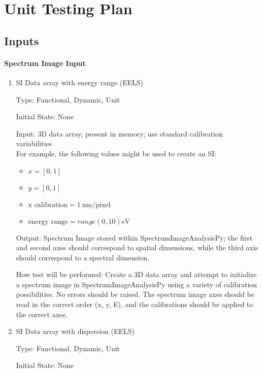 \documentclass[12pt, titlepage]{article}
\newcommand{\progname}{SpectrumImageAnalysisPy}
\begin{document}
				
\section{Unit Testing Plan}

\subsection{Inputs}
		
\paragraph{Spectrum Image Input}

\begin{enumerate}

\item{SI Data array with energy range (EELS)}

Type: Functional, Dynamic, Unit

Initial State: None

Input: 3D data array, present in memory; use standard calibration variabilities\\
For example, the following values might be used to create an SI: 
\begin{itemize}
	\item $x = [0, 1]$
	\item $y = [0, 1]$
	\item $\text{x calibration} = 1\ \si{\nano\metre}/\text{pixel}$
	\item $\text{energy range} = range(0, 10) \si{\electronvolt}$
\end{itemize}

Output: Spectrum Image stored within \progname{}; the first and second axes should correspond to spatial dimensions, while the third axis should correspond to a spectral dimension.

How test will be performed: Create a 3D data array and attempt to initialize a spectrum image in \progname{} using a variety of calibration possibilities. No errors should be raised. The spectrum image axes should be read in the correct order (x, y, E), and the calibrations should be applied to the correct axes.

\item{SI Data array with dispersion (EELS)}

Type: Functional, Dynamic, Unit

Initial State: None


\end{enumerate}
\end{document}
